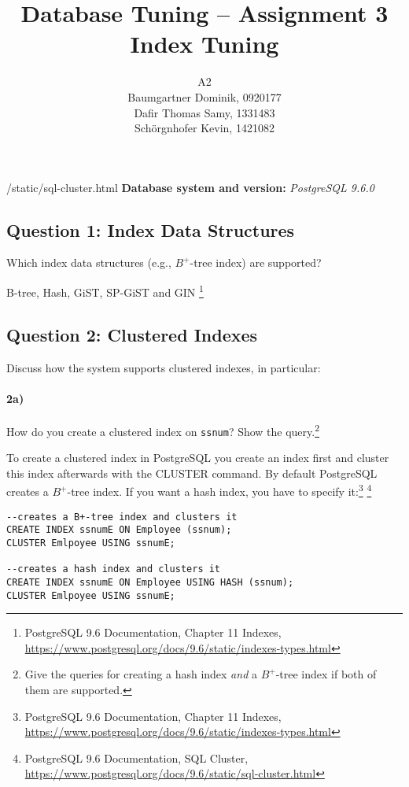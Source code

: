 \documentclass[11pt]{scrartcl}
\title{
  \textbf{\large Database Tuning -- Assignment 3}\\
  Index Tuning
}
\author{
 A2\\
\large Baumgartner Dominik, 0920177 \\
\large Dafir Thomas Samy, 1331483 \\
\large Sch\"orgnhofer Kevin, 1421082
}
\begin{document}
\maketitle

/static/sql-cluster.html
\noindent\textbf{Database system and version:} {\it PostgreSQL 9.6.0}

\subsection*{Question 1: Index Data Structures} Which index data structures (e.g., $B^+$-tree
index) are supported?

B-tree, Hash, GiST, SP-GiST and GIN
\footnote{PostgreSQL 9.6
  Documentation, Chapter 11 Indexes,
  \url{https://www.postgresql.org/docs/9.6/static/indexes-types.html}}


\subsection*{Question 2: Clustered Indexes} Discuss how the system
supports clustered indexes, in particular:

\paragraph{2a)} How do you create a clustered index on {\tt ssnum}?
Show the query.\footnote{Give the queries for creating a hash index
  \emph{and} a $B^+$-tree index if both of them are supported.}

\smallskip

To create a clustered index in PostgreSQL you create an index first and cluster this index afterwards with the CLUSTER command. By default PostgreSQL creates a $B^+$-tree index. If you want a hash index, you have to specify it:\footnote{PostgreSQL 9.6
  Documentation, Chapter 11 Indexes,
  \url{https://www.postgresql.org/docs/9.6/static/indexes-types.html}}
\footnote{PostgreSQL 9.6
  Documentation, SQL Cluster,
  \url{https://www.postgresql.org/docs/9.6/static/sql-cluster.html}}

{\small
\begin{verbatim}
--creates a B+-tree index and clusters it
CREATE INDEX ssnumE ON Employee (ssnum);
CLUSTER Emlpoyee USING ssnumE;

--creates a hash index and clusters it
CREATE INDEX ssnumE ON Employee USING HASH (ssnum);
CLUSTER Emlpoyee USING ssnumE;
\end{verbatim}
}
\end{document}
